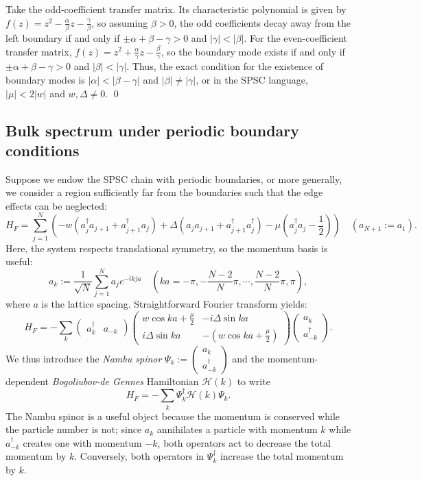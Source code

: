 \documentclass{article}
\begin{document}
Take the odd-coefficient transfer matrix.
Its characteristic polynomial is given by $f(z) = z^2 - \frac{\alpha}{\beta}z - \frac{\gamma}{\beta}$,
so assuming $\beta > 0$, the odd coefficients decay away from the left boundary if and only if
$\pm \alpha + \beta - \gamma >0$ and $|\gamma| < |\beta|$.
For the even-coefficient transfer matrix, $f(z) = z^2 + \frac{\alpha}{\gamma}z - \frac{\beta}{\gamma}$,
so the boundary mode exists if and only if $\pm \alpha + \beta - \gamma > 0$ and $|\beta| < |\gamma|$.
Thus, the exact condition for the existence of boundary modes is $|\alpha| < |\beta - \gamma|$ and $|\beta| \neq |\gamma|$,
or in the SPSC language, $|\mu| < 2|w|$ and $w, \Delta \neq 0$. \qed

\subsection{Bulk spectrum under periodic boundary conditions}
Suppose we endow the SPSC chain with periodic boundaries,
or more generally, we consider a region sufficiently far from the boundaries
such that the edge effects can be neglected:
\[
    H_F = \sum_{j=1}^N \left(
        - w \left( a_j^\dagger a_{j+1} + a_{j+1}^\dagger a_j \right)
        + \Delta \left( a_j a_{j+1} + a_{j+1}^\dagger a_j^\dagger \right)
        - \mu \left( a_j^\dagger a_j - \frac{1}{2} \right)
    \right)\quad
    (a_{N+1} := a_1).
\]
Here, the system respects translational symmetry, so the momentum basis is useful:
\[
    a_k := \frac{1}{\sqrt{N}} \sum_{j=1}^N a_j e^{-ikja}\quad
    \left(ka = -\pi, -\frac{N-2}{N}\pi, \cdots, \frac{N-2}{N}\pi, \pi\right),
\]
where $a$ is the lattice spacing.
Straightforward Fourier transform yields:
\[
    H_F = -\sum_k \begin{pmatrix}
        a_k^\dagger & a_{-k}
    \end{pmatrix} \begin{pmatrix}
        w\cos ka + \frac{\mu}{2} & -i\Delta\sin ka \\
        i\Delta\sin ka & -\left(w\cos ka + \frac{\mu}{2}\right)
    \end{pmatrix} \begin{pmatrix}
        a_k \\ a_{-k}^\dagger
    \end{pmatrix}.
\]
We thus introduce the \emph{Nambu spinor} $\Psi_k := \begin{pmatrix} a_k \\ a_{-k}^\dagger \end{pmatrix}$
and the momentum-dependent \emph{Bogoliubov-de Gennes} Hamiltonian $\mathcal{H}(k)$ to write
\[
    H_F = -\sum_k \Psi_k^\dagger \mathcal{H}(k) \Psi_k.
\]
The Nambu spinor is a useful object because the momentum is conserved while the particle number is not;
since $a_k$ annihilates a particle with momentum $k$ while $a_{-k}^\dagger$ creates one with momentum $-k$,
both operators act to decrease the total momentum by $k$.
Conversely, both operators in $\Psi_k^\dagger$ increase the total momentum by $k$.
\end{document}
